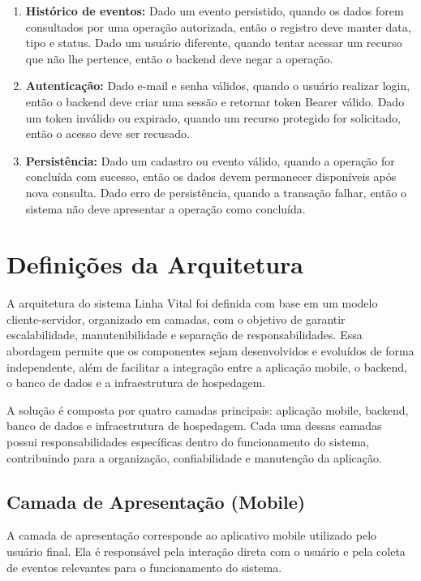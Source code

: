 \begin{enumerate}
\item \textbf{Histórico de eventos:} Dado um evento persistido, quando os dados forem consultados por uma operação autorizada, então o registro deve manter data, tipo e status. Dado um usuário diferente, quando tentar acessar um recurso que não lhe pertence, então o backend deve negar a operação.
\item \textbf{Autenticação:} Dado e-mail e senha válidos, quando o usuário realizar login, então o backend deve criar uma sessão e retornar token Bearer válido. Dado um token inválido ou expirado, quando um recurso protegido for solicitado, então o acesso deve ser recusado.
\item \textbf{Persistência:} Dado um cadastro ou evento válido, quando a operação for concluída com sucesso, então os dados devem permanecer disponíveis após nova consulta. Dado erro de persistência, quando a transação falhar, então o sistema não deve apresentar a operação como concluída.
\end{enumerate}

\section{Definições da Arquitetura}

A arquitetura do sistema Linha Vital foi definida com base em um modelo cliente-servidor, organizado em camadas, com o objetivo de garantir escalabilidade, manutenibilidade e separação de responsabilidades. Essa abordagem permite que os componentes sejam desenvolvidos e evoluídos de forma independente, além de facilitar a integração entre a aplicação mobile, o backend, o banco de dados e a infraestrutura de hospedagem.

A solução é composta por quatro camadas principais: aplicação mobile, backend, banco de dados e infraestrutura de hospedagem. Cada uma dessas camadas possui responsabilidades específicas dentro do funcionamento do sistema, contribuindo para a organização, confiabilidade e manutenção da aplicação.

\subsection{Camada de Apresentação (Mobile)}

A camada de apresentação corresponde ao aplicativo mobile utilizado pelo usuário final. Ela é responsável pela interação direta com o usuário e pela coleta de eventos relevantes para o funcionamento do sistema.

